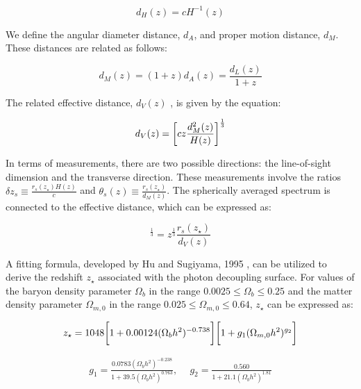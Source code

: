 \documentclass[universe,article,accept,moreauthors,pdftex]{Definitions/mdpi}
\begin{document}
\begin{equation}
d_{H}(z)=cH^{-1}(z)
\end{equation}

We define the angular diameter distance, $d_{A}$, and proper motion distance, $d_{M}$. These distances are related as follows:

\begin{equation}\label{dm}
d_{M}(z)=(1+z)d_{A}(z)=\frac{d_{L}(z)}{1+z}
\end{equation}

The related effective distance, $d_{V}(z)$ \cite{SDSS:2005xqv}, is given by the equation:

\begin{equation}
d_{V}(z)=\bigg{[}c z\frac{ d^{2}_{M}(z)}{H(z)}\bigg{]}^{\frac{1}{3}}
\end{equation}

In terms of measurements, there are two possible directions: the line-of-sight dimension and the transverse direction. These measurements involve the ratios $\delta z_{s}\equiv\frac{r_{s}(z_{\star})H(z)}{c}$ and $\theta_{s}(z)\equiv \frac{r_{s}(z_{\star})}{d_{M}(z)}$. The spherically averaged spectrum is connected to the effective distance, which can be expressed as:

\begin{equation}
[\theta_{s}^{2}(z)\delta z_{s}]^{\frac{1}{3}}= z^{\frac{1}{3}}\frac{r_{s}(z_{\star}) }{d_{V}(z)}
\end{equation}



 A fitting formula, developed by Hu and Sugiyama, 1995 \cite{Hu:1995en}, can be utilized to derive the redshift $z_{\star}$ associated with the photon decoupling surface. For values of the baryon density parameter $\Omega_{b}$ in the range $0.0025\leq\Omega_{b}\leq 0.25$ and the matter density parameter $\Omega_{m,0}$ in the range $0.025\leq \Omega_{m,0}\leq 0.64$, $z_{\star}$ can be expressed as:

\begin{equation}
z_{\star}=1048\bigg{[}1+0.00124 (\Omega_{b}h^{2})^{-0.738}\bigg{]}\bigg{[}1+g_{1}(\Omega_{m,0}h^{2})^{g_{2}}\bigg{]}
\end{equation}

\begin{align}
g_{1}=\frac{0.0783(\Omega_{b}h^{2})^{-0.238}}{1+39.5 (\Omega_{b}h^{2})^{0.763}}, \quad \ g_{2}=\frac{0.560}{1+21.1 (\Omega_{b}h^{2})^{1.81}}
\end{align} 
\end{document}
